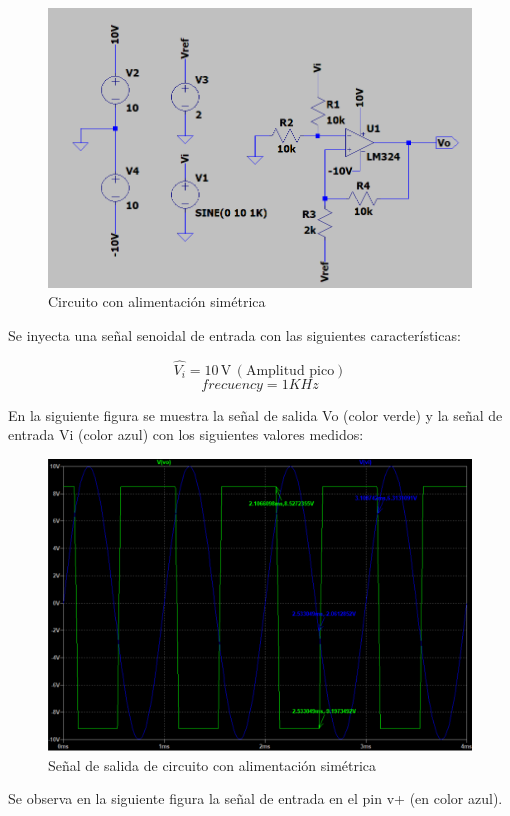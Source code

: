 \begin{figure}[H]
    \centering
    \includegraphics[width=0.8\linewidth]{Circuito4.png}
    \caption{Circuito con alimentación simétrica}
    \label{fig:enter-label}
\end{figure}
Se inyecta una señal senoidal de entrada con las siguientes características:

\[ \widehat{V_i} = 10 \, \text{V} \, (\text{Amplitud pico}) \]
\[frecuency= 1KHz\]

En la siguiente figura se muestra la señal de salida Vo (color verde)  y la señal de entrada Vi (color azul) con los siguientes valores medidos:
\begin{figure}[H]
    \centering
    \includegraphics[width=1.0\linewidth]{Secciones/Circuito4/Circuito 4 - Simulación con alimentación simétrica.png}
    \caption{Señal de salida de circuito con alimentación simétrica}
    \label{fig:SimulacionConAlimentacionSimetrica}
\end{figure}

Se observa en la siguiente figura la señal de entrada en el pin v+ (en color azul).

